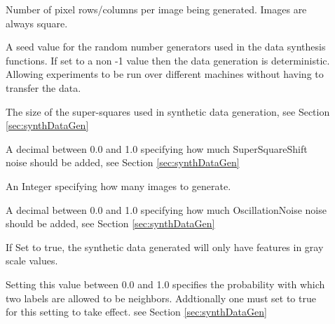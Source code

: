 \begin{description}
\item[] Number of pixel rows/columns per image being generated. Images are always square. 
\item[] A seed value for the random number generators used in the data synthesis functions. If set to a non -1 value then the data generation is deterministic.  Allowing experiments to be run over different machines without having to transfer the data. 
\item[] The size of the super-squares used in synthetic data generation, see Section \ref{sec:synthDataGen}
\item[] A decimal between 0.0 and 1.0 specifying how much SuperSquareShift noise should be added, see Section \ref{sec:synthDataGen}
\item[] An Integer specifying how many images to generate. 
\item[] A decimal between 0.0 and 1.0 specifying how much  OscillationNoise noise should be added, see Section \ref{sec:synthDataGen}
\item[] If Set to true, the synthetic data generated will only have features in gray scale values.
\item[] Setting this value between 0.0 and 1.0 specifies the probability with which two labels are allowed to be neighbors. Addtionally one must set  to true for this setting to take effect.  see Section  \ref{sec:synthDataGen}
\item[]
\item[]
\item[]
\item[]
\item[]
\item[]
\item[]
\item[]
\item[]
\item[]

\item[]
\item[]
\item[]
\item[]
\item[]
\item[]
\item[]
\item[]
\item[]



\end{description}
